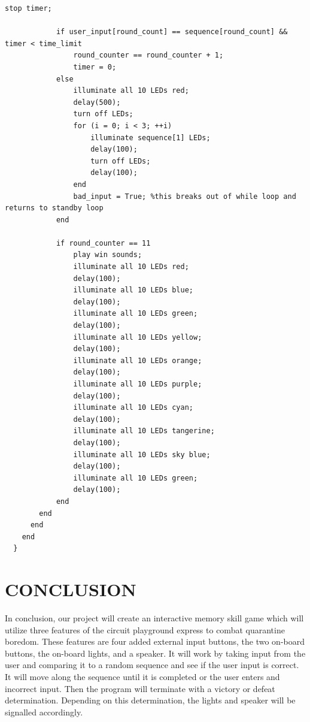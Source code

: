 \documentclass[12pt]{article}
\begin{document}
\begin{lstlisting}[language=Arduino]
            stop timer;
            
            if user_input[round_count] == sequence[round_count] && timer < time_limit
                round_counter == round_counter + 1;
                timer = 0;
            else
                illuminate all 10 LEDs red;
                delay(500);
                turn off LEDs;
                for (i = 0; i < 3; ++i)
                    illuminate sequence[1] LEDs;
                    delay(100);
                    turn off LEDs;
                    delay(100);
                end
                bad_input = True; %this breaks out of while loop and returns to standby loop
            end
            
            if round_counter == 11
                play win sounds;
                illuminate all 10 LEDs red;
                delay(100);
                illuminate all 10 LEDs blue;
                delay(100);
                illuminate all 10 LEDs green;
                delay(100);
                illuminate all 10 LEDs yellow;
                delay(100);
                illuminate all 10 LEDs orange;
                delay(100);
                illuminate all 10 LEDs purple;
                delay(100);
                illuminate all 10 LEDs cyan;
                delay(100);
                illuminate all 10 LEDs tangerine;
                delay(100);
                illuminate all 10 LEDs sky blue;
                delay(100);
                illuminate all 10 LEDs green;
                delay(100);
            end
        end
      end
    end
  }  

 \end{lstlisting}

\section{CONCLUSION}
In conclusion, our project will create an interactive memory skill game which will utilize three features of the circuit playground express to combat quarantine boredom. These features are four added external input buttons, the two on-board buttons, the on-board lights, and a speaker. It will work by taking input from the user and comparing it to a random sequence and see if the user input is correct. It will move along the sequence until it is completed or the user enters and incorrect input. Then the program will terminate with a victory or defeat determination. Depending on this determination, the lights and speaker will be signalled accordingly.

\newpage



\end{document}
